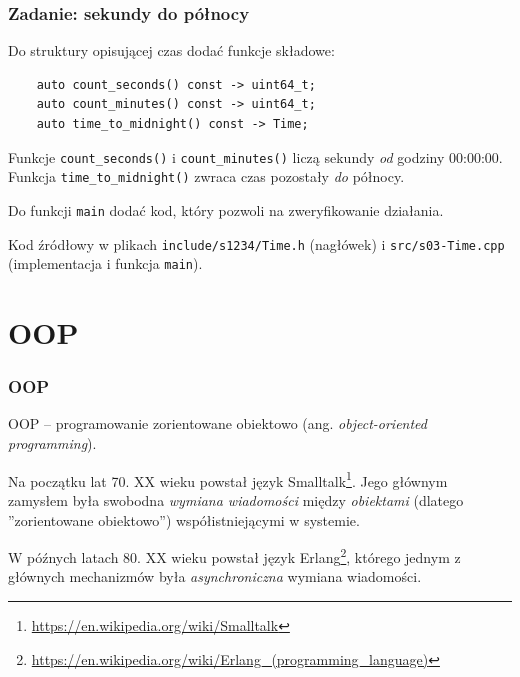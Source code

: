 \documentclass[aspectratio=169,10pt]{beamer}
\begin{document}
\begin{frame}[fragile]
    \frametitle{Zadanie: sekundy do północy}
    \label{lecture_exercise_4}

    Do struktury opisującej czas dodać funkcje składowe:

    {\scriptsize
    \begin{lstlisting}
    auto count_seconds() const -> uint64_t;
    auto count_minutes() const -> uint64_t;
    auto time_to_midnight() const -> Time;
    \end{lstlisting}}

    Funkcje \texttt{count\_seconds()} i \texttt{count\_minutes()} liczą sekundy
    \emph{od} godziny 00:00:00.\\
    Funkcja \texttt{time\_to\_midnight()} zwraca czas pozostały \emph{do} północy.

    Do funkcji \texttt{main} dodać kod, który pozwoli na zweryfikowanie
    działania.

    \vspace{1em}

    {\footnotesize
    Kod źródłowy w plikach {\tt include/s1234/Time.h} (nagłówek) i
    {\tt src/s03-Time.cpp} (implementacja i funkcja {\tt main}).}
\end{frame}


\section{OOP}

\begin{frame}
    \frametitle{OOP}

    OOP -- programowanie zorientowane obiektowo (ang. \emph{object-oriented
    programming}).

    \vspace{1em}

    Na początku lat 70. XX wieku powstał język
    Smalltalk\footnote{\url{https://en.wikipedia.org/wiki/Smalltalk}}. Jego
    głównym zamysłem była swobodna \emph{wymiana wiadomości} między
    \emph{obiektami} (dlatego ''zorientowane obiektowo'') współistniejącymi w
    systemie.

    W późnych latach 80. XX wieku powstał język
    Erlang\footnote{\url{https://en.wikipedia.org/wiki/Erlang_(programming_language)}},
    którego jednym z głównych mechanizmów była \emph{asynchroniczna} wymiana
    wiadomości.
\end{frame}
\end{document}
